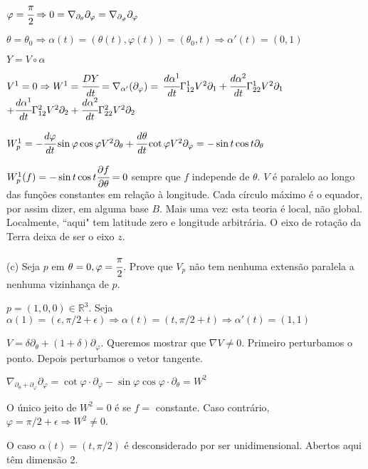 \documentclass[12pt]{article}
\begin{document}
		$\varphi = \cfrac{\pi}{2} \Rightarrow 0 = \nabla_{\partial_\theta} \partial_\varphi = \nabla_{\partial_\varphi} \partial_\varphi$

		$\theta = \theta_0 \Rightarrow \alpha(t) = (\theta(t), \varphi(t)) = (\theta_0, t) \Rightarrow \alpha'(t) = (0, 1)$

		$Y = V \circ \alpha$

		$V^1 = 0 \Rightarrow W^1 = \cfrac{DY}{dt} = \nabla_{\alpha'} (\partial_\varphi) = $
		$\cfrac{d\alpha^1}{dt} \Gamma_{12}^1 V^2 \partial_1 + \cfrac{d\alpha^2}{dt} \Gamma_{22}^1 V^2 \partial_1$
		$+ \cfrac{d\alpha^1}{dt} \Gamma_{12}^2 V^2 \partial_2 + \cfrac{d\alpha^2}{dt} \Gamma_{22}^2 V^2 \partial_2$

		$W_p^1 = - \cfrac{d\varphi}{dt} \sin \varphi \cos \varphi V^2 \partial_\theta + \cfrac{d\theta}{dt} \cot \varphi V^2 \partial_\varphi = - \sin t \cos t \partial_\theta$

		$W_p^1(f) = - \sin t \cos t \cfrac{\partial f}{\partial \theta} = 0$ sempre que $f$ independe de $\theta$. $V$ \'e paralelo ao longo das fun\c{c}\~oes constantes em rela\c{c}\~ao \`a longitude. Cada c\'irculo m\'aximo \'e o equador, por assim dizer, em alguma base $B$. Mais uma vez: esta teoria \'e local, n\~ao global. Localmente, ``aqui" tem latitude zero e longitude arbitr\'aria. O eixo de rota\c{c}\~ao da Terra deixa de ser o eixo $z$.

		\vspace{3mm}

		(c) Seja $p$ em $\theta = 0, \varphi = \cfrac{\pi}{2}$. Prove que $V_p$ n\~ao tem nenhuma extens\~ao paralela a nenhuma vizinhan\c{c}a de $p$.

		$p = (1,0,0) \in \mathbb{R}^3$. Seja $\alpha(1) = (\epsilon, \pi/2 + \epsilon) \Rightarrow \alpha(t) = (t, \pi/2 + t) \Rightarrow \alpha'(t) = (1, 1)$

		$V = \delta \partial_\theta + (1 + \delta) \partial_\varphi$. Queremos mostrar que $\nabla V \ne 0$. Primeiro perturbamos o ponto. Depois perturbamos o vetor tangente.

		$\nabla_{\partial_\theta + \partial_\varphi} \partial_\varphi = \cot \varphi \cdot \partial_\varphi - \sin \varphi \cos \varphi \cdot \partial_\theta = W^2$

		O \'unico jeito de $W^2 = 0$ \'e se $f =$ constante. Caso contr\'ario, $\varphi = \pi/2 + \epsilon \Rightarrow W^2 \ne 0$.

		O caso $\alpha(t) = (t, \pi/2)$ \'e desconsiderado por ser unidimensional. Abertos aqui t\^em dimens\~ao 2.
\end{document}
